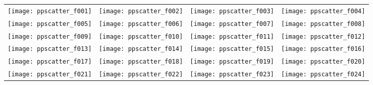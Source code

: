 \documentclass[sigconf]{acmart}
\begin{document}
\begin{figure*}
\begin{tabular}{*{4}{@{}c@{}}}
    \texttt{[image: ppscatter\_f001]}&
    \texttt{[image: ppscatter\_f002]}&
    \texttt{[image: ppscatter\_f003]}&
    \texttt{[image: ppscatter\_f004]}\\[-0.6em]
    \texttt{[image: ppscatter\_f005]}&
    \texttt{[image: ppscatter\_f006]}&
    \texttt{[image: ppscatter\_f007]}&
    \texttt{[image: ppscatter\_f008]}\\[-0.6em]
    \texttt{[image: ppscatter\_f009]}&
    \texttt{[image: ppscatter\_f010]}&
    \texttt{[image: ppscatter\_f011]}&
    \texttt{[image: ppscatter\_f012]}\\[-0.6em]
    \texttt{[image: ppscatter\_f013]}&
    \texttt{[image: ppscatter\_f014]}&
    \texttt{[image: ppscatter\_f015]}&
    \texttt{[image: ppscatter\_f016]}\\[-0.6em]
    \texttt{[image: ppscatter\_f017]}&
    \texttt{[image: ppscatter\_f018]}&
    \texttt{[image: ppscatter\_f019]}&
    \texttt{[image: ppscatter\_f020]}\\[-0.6em]
    \texttt{[image: ppscatter\_f021]}&
    \texttt{[image: ppscatter\_f022]}&
    \texttt{[image: ppscatter\_f023]}&
    \texttt{[image: ppscatter\_f024]}
\end{tabular}
\caption{\label{fig:scatterplots}
}
\end{figure*}


 
\end{document}
